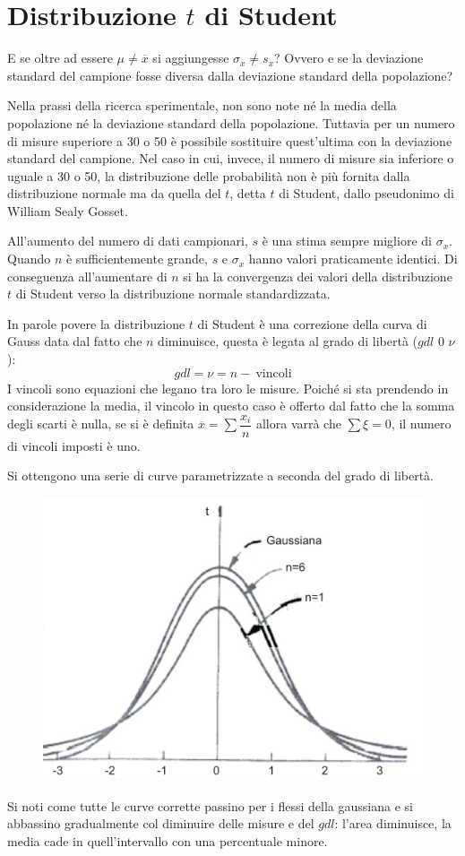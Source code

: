 \documentclass[a4paper, 15pt]{article}
\begin{document}
\section{Distribuzione $t$ di Student}
\begin{adjustwidth}{2in}{}		
	E se oltre ad essere $\mu\ne\overline{x}$ si aggiungesse $\sigma_x\ne s_x$? Ovvero e se la deviazione standard del campione fosse diversa dalla deviazione standard della popolazione? \newline 
	
	Nella prassi della ricerca sperimentale, non sono note né la media della popolazione né la deviazione standard della popolazione. Tuttavia per un numero di misure superiore a 30 o 50 è possibile sostituire quest’ultima con la deviazione standard del campione. Nel caso in cui, invece, il numero di misure sia inferiore o uguale a 30 o 50, la distribuzione delle probabilità non è più fornita dalla distribuzione normale ma da quella del $ t $, detta $ t $ di Student, dallo pseudonimo di William Sealy Gosset. 
	
	All'aumento del numero di dati campionari, $ s $ è una stima sempre migliore di $\sigma_x$. Quando $ n $ è sufficientemente grande, $ s $ e $\sigma_x$ hanno valori praticamente identici. Di conseguenza all'aumentare di $ n $ si ha la convergenza dei valori della distribuzione $ t $ di Student verso la distribuzione normale standardizzata.\newline 
	
	In parole povere la distribuzione $t$ di Student è una correzione della curva di Gauss data dal fatto che $n$ diminuisce, questa è legata al grado di libertà ($gdl$ 0 $\nu$):
	\[gdl = \nu = n - ~ \text{vincoli}\]
	I vincoli sono equazioni che legano tra loro le misure. Poiché si sta prendendo in considerazione la media, il vincolo in questo caso è offerto dal fatto che la somma degli scarti è nulla, se si è definita \(\overline{x} = \sum\dfrac{x_i}{n}\) allora varrà che \(\sum\xi=0\), il numero di vincoli imposti è uno. \newline 
	
	Si ottengono una serie di curve parametrizzate a seconda del grado di libertà. 	
	\begin{figure}[H]
		\centering
		\includegraphics[width=0.5\linewidth]{fig/screenshot009}
		\label{fig:screenshot009}
	\end{figure}
	Si noti come tutte le curve corrette passino per i flessi della gaussiana e si abbassino gradualmente col diminuire delle misure e del $gdl$: l'area diminuisce, la media cade in quell'intervallo con una percentuale minore.\newline 
	

\end{adjustwidth}
\end{document}
